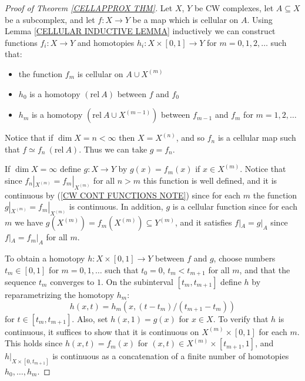 \documentclass[11pt, letterpaper, oneside]{report}
\theoremstyle{pplain}
\theoremstyle{ddefinition}
\theoremstyle{nnn}
\theoremstyle{eexercise}
\newcommand{\bit}{\begin{itemize}}
\newcommand{\eit}{\end{itemize}}
\newcommand{\rel}{\mathrm{rel\ }}
\begin{document}
\begin{proof}[Proof of Theorem \ref{CELLAPPROX THM}]
Let $X$, $Y$ be CW complexes,  let $A\subseteq X$ be a subcomplex, and let $f\colon X\to Y$
be a map which is cellular on $A$. Using Lemma \ref{CELLULAR INDUCTIVE LEMMA} inductively 
we can construct functions $f_{i}\colon X \to Y$ and homotopies $h_{i}\colon X\times [0, 1] \to Y$
for $m=0, 1, 2, \dots$ such that:
\bit
\item the function $f_{m}$ is cellular on $A\cup X^{(m)}$
\item $h_{0}$ is a homotopy $(\rel A)$ between $f$ and $f_{0}$
\item $h_{m}$ is a homotopy  $(\rel A\cup X^{(m-1)})$ between $f_{m-1}$ 
and $f_{m}$ for $m=1, 2, \dots$
\eit
Notice that if $\dim X = n < \infty$ then $X = X^{(n)}$, and so 
$f_{n}$ is a cellular map such that $f \simeq f_{n} \ (\rel A)$. Thus we can take $g = f_{n}$. 

If $\dim X = \infty$ define $g\colon X \to Y$ by $g(x) = f_{m}(x)$ if $x\in X^{(m)}$.
Notice that since $f_{n}|_{X^{(m)}} = f_{m}|_{X^{(m)}}$ for all $n > m$ this function is well defined, 
and it is continuous by (\ref{CW CONT FUNCTIONS NOTE}) since for each $m$ the function 
$g|_{X^{(m)}} = f_{m}|_{X^{(m)}}$ is continuous. In addition, $g$ is a cellular function since for each
$m$ we have $g(X^{(m)}) = f_{m}(X^{(m)}) \subseteq Y^{(m)}$, and it satisfies $f|_{A} = g|_{A}$ since 
$f|_{A} = f_{m}|_{A}$ for all $m$. 

To obtain a homotopy $h\colon X \times [0, 1] \to Y$ between $f$ and $g$, choose numbers 
$t_{m}\in [0, 1]$ for $m=0, 1, \dots$ such that $t_{0} = 0$, $t_{m} < t_{m+1}$ for all $m$, and 
that the sequence $t_{m}$ converges to $1$. On the subinterval $[t_{m}, t_{m+1}]$ define $h$
by reparametrizing the homotopy $h_{m}$:
$$h(x, t) = h_{m}(x, (t-t_{m})/(t_{m+1} - t_{m}))$$
for $t\in [t_{m}, t_{m+1}]$. Also, set $h(x, 1) = g(x)$ for $x\in X$.  To verify that $h$ is continuous, 
it suffices to show that it is continuous on $X^{(m)}\times [0, 1]$ for each $m$. This holds since 
$h(x, t) = f_{m}(x)$ for $(x, t) \in X^{(m)} \times [t_{m+1}, 1]$, and $h|_{X\times [0, t_{m+1}]}$ is continuous 
as a concatenation of a finite number of homotopies $h_{0}, \dots, h_{m}$. 


\end{proof}






\end{document}
